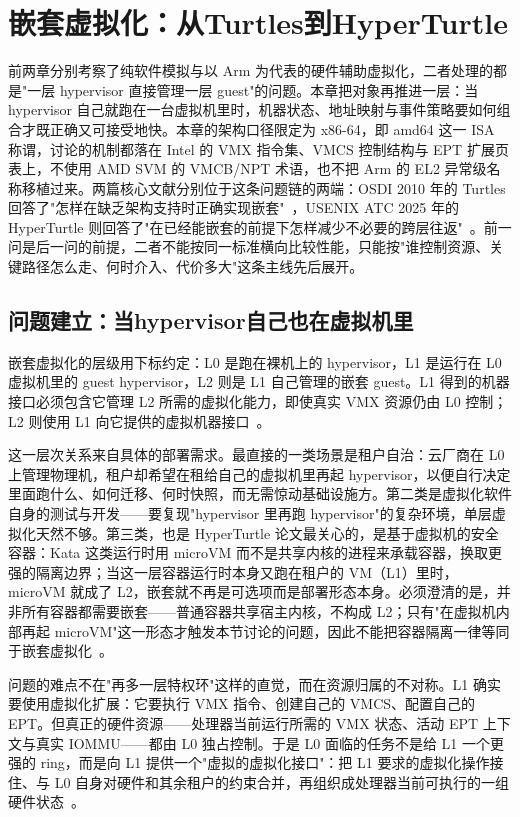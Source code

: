 \section{嵌套虚拟化：从Turtles到HyperTurtle}\label{sec:nested}

前两章分别考察了纯软件模拟与以 Arm 为代表的硬件辅助虚拟化，二者处理的都是"一层 hypervisor 直接管理一层 guest"的问题。本章把对象再推进一层：当 hypervisor 自己就跑在一台虚拟机里时，机器状态、地址映射与事件策略要如何组合才既正确又可接受地快。本章的架构口径限定为 x86-64，即 amd64 这一 ISA 称谓，讨论的机制都落在 Intel 的 VMX 指令集、VMCS 控制结构与 EPT 扩展页表上，不使用 AMD SVM 的 VMCB/NPT 术语，也不把 Arm 的 EL2 异常级名称移植过来。两篇核心文献分别位于这条问题链的两端：OSDI 2010 年的 Turtles 回答了"怎样在缺乏架构支持时正确实现嵌套"~\cite{source7}，USENIX ATC 2025 年的 HyperTurtle 则回答了"在已经能嵌套的前提下怎样减少不必要的跨层往返"~\cite{source8}。前一问是后一问的前提，二者不能按同一标准横向比较性能，只能按"谁控制资源、关键路径怎么走、何时介入、代价多大"这条主线先后展开。

\subsection{问题建立：当hypervisor自己也在虚拟机里}\label{sec:nested-problem}

嵌套虚拟化的层级用下标约定：L0 是跑在裸机上的 hypervisor，L1 是运行在 L0 虚拟机里的 guest hypervisor，L2 则是 L1 自己管理的嵌套 guest。L1 得到的机器接口必须包含它管理 L2 所需的虚拟化能力，即使真实 VMX 资源仍由 L0 控制；L2 则使用 L1 向它提供的虚拟机器接口~\cite{source7,source8}。

这一层次关系来自具体的部署需求。最直接的一类场景是租户自治：云厂商在 L0 上管理物理机，租户却希望在租给自己的虚拟机里再起 hypervisor，以便自行决定里面跑什么、如何迁移、何时快照，而无需惊动基础设施方。第二类是虚拟化软件自身的测试与开发——要复现"hypervisor 里再跑 hypervisor"的复杂环境，单层虚拟化天然不够。第三类，也是 HyperTurtle 论文最关心的，是基于虚拟机的安全容器：Kata 这类运行时用 microVM 而不是共享内核的进程来承载容器，换取更强的隔离边界；当这一层容器运行时本身又跑在租户的 VM（L1）里时，microVM 就成了 L2，嵌套就不再是可选项而是部署形态本身。必须澄清的是，并非所有容器都需要嵌套——普通容器共享宿主内核，不构成 L2；只有"在虚拟机内部再起 microVM"这一形态才触发本节讨论的问题，因此不能把容器隔离一律等同于嵌套虚拟化~\cite{source8}。

问题的难点不在"再多一层特权环"这样的直觉，而在资源归属的不对称。L1 确实要使用虚拟化扩展：它要执行 VMX 指令、创建自己的 VMCS、配置自己的 EPT。但真正的硬件资源——处理器当前运行所需的 VMX 状态、活动 EPT 上下文与真实 IOMMU——都由 L0 独占控制。于是 L0 面临的任务不是给 L1 一个更强的 ring，而是向 L1 提供一个"虚拟的虚拟化接口"：把 L1 要求的虚拟化操作接住、与 L0 自身对硬件和其余租户的约束合并，再组织成处理器当前可执行的一组硬件状态~\cite{source7}。

